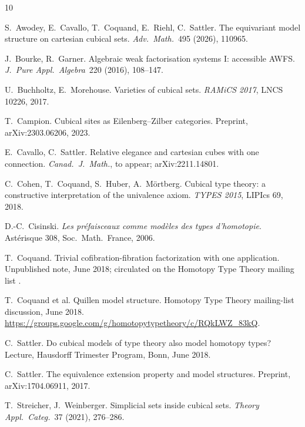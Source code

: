 \documentclass[11pt]{amsart}
\theoremstyle{definition}
\begin{document}
\begin{thebibliography}{10}

S.~Awodey, E.~Cavallo, T.~Coquand, E.~Riehl, C.~Sattler.
\newblock The equivariant model structure on cartesian cubical
  sets.
\newblock \emph{Adv.\ Math.}\ 495 (2026), 110965.

J.~Bourke, R.~Garner.
\newblock Algebraic weak factorisation systems I: accessible AWFS.
\newblock \emph{J.\ Pure Appl.\ Algebra}\ 220 (2016), 108--147.

U.~Buchholtz, E.~Morehouse.
\newblock Varieties of cubical sets.
\newblock \emph{RAMiCS 2017}, LNCS 10226, 2017.

T.~Campion.
\newblock Cubical sites as Eilenberg--Zilber categories.
\newblock Preprint, arXiv:2303.06206, 2023.

E.~Cavallo, C.~Sattler.
\newblock Relative elegance and cartesian cubes with one
  connection.
\newblock \emph{Canad.\ J.\ Math.}, to appear; arXiv:2211.14801.

C.~Cohen, T.~Coquand, S.~Huber, A.~M\"ortberg.
\newblock Cubical type theory: a constructive interpretation of
  the univalence axiom.
\newblock \emph{TYPES 2015}, LIPIcs 69, 2018.

D.-C.~Cisinski.
\newblock \emph{Les pr\'efaisceaux comme mod\`eles des types
  d'homotopie}.
\newblock Ast\'erisque 308, Soc.\ Math.\ France, 2006.

T.~Coquand.
\newblock Trivial cofibration-fibration factorization with one
  application.
\newblock Unpublished note, June 2018; circulated on the Homotopy
  Type Theory mailing list \cite{CoqML}.

T.~Coquand et al.
\newblock Quillen model structure.
\newblock Homotopy Type Theory mailing-list discussion, June 2018.
\newblock \url{https://groups.google.com/g/homotopytypetheory/c/RQkLWZ_83kQ}.

C.~Sattler.
\newblock Do cubical models of type theory also model homotopy
  types?
\newblock Lecture, Hausdorff Trimester Program, Bonn, June 2018.

C.~Sattler.
\newblock The equivalence extension property and model structures.
\newblock Preprint, arXiv:1704.06911, 2017.

T.~Streicher, J.~Weinberger.
\newblock Simplicial sets inside cubical sets.
\newblock \emph{Theory Appl.\ Categ.}\ 37 (2021), 276--286.


\end{thebibliography}
\end{document}
